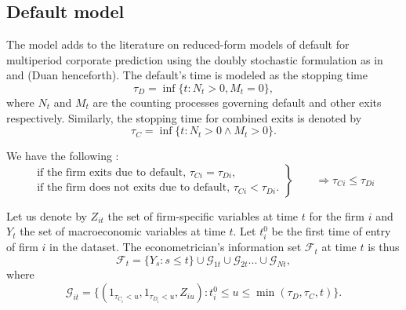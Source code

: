 \subsection{Default model}
\label{SS:2-1}

The model adds to the literature on reduced-form models of default for multiperiod corporate prediction using the doubly stochastic formulation as in \citet{DSW} and \citet{Duan2012} (Duan henceforth). The default's time is modeled as the stopping time 
\begin{equation}
\tau_D = \inf\{t : N_t >0 , M_t = 0\},
\end{equation}
where $N_t$ and $M_t$ are the counting processes governing default and other exits respectively. Similarly, the stopping time for combined exits is denoted by
\begin{equation}
\tau_C = \inf\{t : N_t >0 \wedge M_t > 0\}.
\end{equation}

\noindent We have the following :
\begin{equation*}
 \left.\begin{aligned}
        \text{if the firm exits due to default, } \tau_{Ci} = \tau_{Di},\\
        \text{if the firm does not exits due to default, } \tau_{Ci} < \tau_{Di}.
       \end{aligned}
 \right\}
 \qquad \text{$\Rightarrow \tau_{Ci} \leq \tau_{Di}$}
\end{equation*}

Let us denote by $Z_{it}$ the set of firm-specific variables at time $t$ for the firm $i$ and $Y_t$ the set of macroeconomic variables at time $t$. Let  $t_i^0$ be the first time of entry of firm $i$ in the dataset. The econometrician's information set $\mathscr{F}_t$ at time $t$ is thus
\begin{equation}
    \mathscr{F}_t = \{ Y_s : s \leq t \} \cup \mathscr{G}_{1t}  \cup \mathscr{G}_{2t} ... \cup \mathscr{G}_{Nt},
\end{equation}
where 
\begin{equation}
    \mathscr{G}_{it}  = \{  (1_{\tau_{C_i} < u} , 1_{\tau_{D_i} < u} , Z_{iu}) : t_i^0 \leq u \leq \min(\tau_D, \tau_C, t)  \}.
\end{equation}

